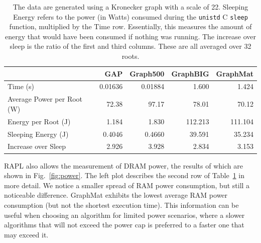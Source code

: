 \documentclass{llncs}
\begin{document}
\begin{table}
	\caption{The data are generated using a Kronecker graph with a scale of 22. Sleeping Energy refers to the power (in Watts) consumed during the \texttt{unistd} C \texttt{sleep} function, multiplied by the Time row. Essentially, this measures the amount of energy that would have been consumed if nothing was running. The increase over sleep is the ratio of the first and third columns. These are all averaged over 32 roots.}
	\centering
	\begin{tabular}{l|r|r|r|r}
			&	GAP  &    Graph500 & GraphBIG & GraphMat \\ \hline
		Time (s) &  0.01636 & 0.01884 & 1.600 & 1.424 \\
		Average Power per Root (W) & 72.38 & 97.17 & 78.01 & 70.12 \\
		Energy per Root (J) &	1.184 & 1.830 & 112.213 & 111.104 \\
		Sleeping Energy (J) & 0.4046  & 0.4660 & 39.591 &  35.234 \\
		Increase over Sleep & 2.926 & 3.928 & 2.834 & 3.153
	\end{tabular}
	\label{tab:power}
\end{table}

RAPL also allows the measurement of DRAM power, the results of which are shown in Fig.~\ref{fig:power}. The left plot describes the second row of Table~\ref{tab:power} in more detail. We notice a smaller spread of RAM power consumption, but still a noticeable difference. GraphMat exhibits the lowest average RAM power consumption (but not the shortest execution time). This information can be useful when choosing an algorithm for limited power scenarios, where a slower algorithms that will not exceed the power cap is preferred to a faster one that may exceed it.
\end{document}
